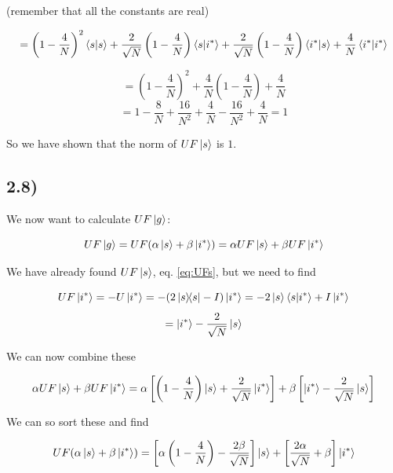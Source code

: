 \documentclass[a4paper,norsk, 10pt]{article}
\begin{document}
(remember that all the constants are real)

\begin{equation}
= \left(1 - \frac{4}{N}\right)^2\braket{s}{s} +\frac{2}{\sqrt{N}} \left(1 - \frac{4}{N}\right)\bra{s}\ket{i^*} + \frac{2}{\sqrt{N}} \left(1 - \frac{4}{N}\right)\bra{i^*}\ket{s} + \frac{4}{N}\braket{i^*}{i^*}
\end{equation}

\begin{equation}
= \left(1 - \frac{4}{N}\right)^2 + \frac{4}{N}\left(1 - \frac{4}{N}\right) + \frac{4}{N}
\end{equation}
\begin{equation}
= 1 - \frac{8}{N} + \frac{16}{N^2} + \frac{4}{N} - \frac{16}{N^2} + \frac{4}{N} = 1
\end{equation}


So we have shown that the norm of $UF\ket{s}$ is $1$.


\subsection{2.8)}

We now want to calculate $UF\ket{g}$:

\begin{equation}
UF\ket{g} = UF(\alpha\ket{s} + \beta\ket{i^*}) = \alpha UF\ket{s} + \beta UF\ket{i^*}
\end{equation}

We have already found $UF\ket{s}$, eq. \eqref{eq:UFs}, but we need to find

\begin{equation}
UF\ket{i^*} = -U\ket{i^*} = -(2\ketbra{s}{s} - I)\ket{i^*} = -2\ket{s}\braket{s}{i^*} + I\ket{i^*}
\end{equation}
\begin{equation}
= \ket{i^*} - \frac{2}{\sqrt{N}}\ket{s}
\end{equation}


We can now combine these

\begin{equation}
\alpha UF\ket{s} + \beta UF\ket{i^*} = \alpha\left[\left(1 - \frac{4}{N}\right)\ket{s} + \frac{2}{\sqrt{N}}\ket{i^*} \right] + \beta\left[\ket{i^*} - \frac{2}{\sqrt{N}}\ket{s}\right]
\end{equation}

We can so sort these and find 

\begin{equation}
UF(\alpha\ket{s} + \beta\ket{i^*}) = \left[\alpha\left(1 - \frac{4}{N}\right) - \frac{2\beta}{\sqrt{N}}\right]\ket{s} + \left[\frac{2\alpha}{\sqrt{N}} + \beta\right]\ket{i^*}
\label{eq:UFg}
\end{equation}
\end{document}
